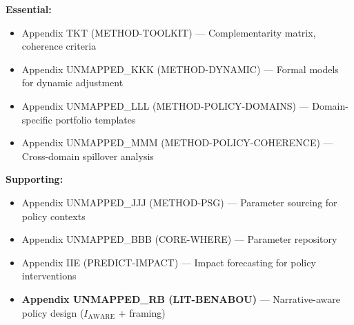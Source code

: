 
\begin{tcolorbox}[colback=yellow!10!white, colframe=orange!75!black, title=Appendix References]

\textbf{Essential:}
\begin{itemize}[nosep]
\item Appendix TKT (METHOD-TOOLKIT) --- Complementarity matrix, coherence criteria
\item Appendix UNMAPPED_KKK (METHOD-DYNAMIC) --- Formal models for dynamic adjustment
\item Appendix UNMAPPED_LLL (METHOD-POLICY-DOMAINS) --- Domain-specific portfolio templates
\item Appendix UNMAPPED_MMM (METHOD-POLICY-COHERENCE) --- Cross-domain spillover analysis
\end{itemize}

\textbf{Supporting:}
\begin{itemize}[nosep]
\item Appendix UNMAPPED_JJJ (METHOD-PSG) --- Parameter sourcing for policy contexts
\item Appendix UNMAPPED_BBB (CORE-WHERE) --- Parameter repository
\item Appendix IIE (PREDICT-IMPACT) --- Impact forecasting for policy interventions
\item \textbf{Appendix UNMAPPED_RB (LIT-BENABOU)} --- Narrative-aware policy design ($I_{\text{AWARE}}$ + framing)
\end{itemize}

\end{tcolorbox}

